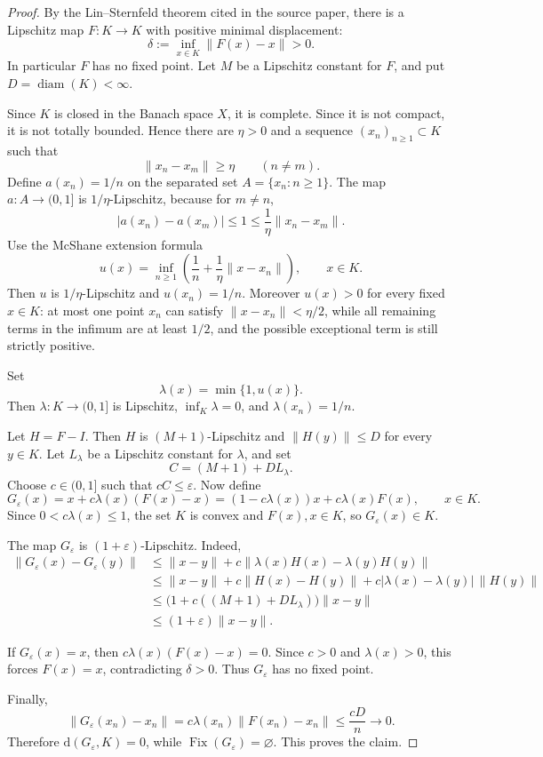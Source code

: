 \documentclass[11pt]{article}
\newcommand{\Fix}{\operatorname{Fix}}
\newcommand{\diam}{\operatorname{diam}}
\begin{document}
\begin{proof}
By the Lin--Sternfeld theorem cited in the source paper, there is a
Lipschitz map \(F:K\to K\) with positive minimal displacement:
\[
\delta:=\inf_{x\in K}\|F(x)-x\|>0.
\]
In particular \(F\) has no fixed point.  Let \(M\) be a Lipschitz constant
for \(F\), and put \(D=\diam(K)<\infty\).

Since \(K\) is closed in the Banach space \(X\), it is complete.  Since it
is not compact, it is not totally bounded.  Hence there are \(\eta>0\) and
a sequence \((x_n)_{n\ge 1}\subset K\) such that
\[
\|x_n-x_m\|\ge \eta \qquad (n\ne m).
\]
Define \(a(x_n)=1/n\) on the separated set \(A=\{x_n:n\ge 1\}\).  The map
\(a:A\to(0,1]\) is \(1/\eta\)-Lipschitz, because for \(m\ne n\),
\[
|a(x_n)-a(x_m)|\le 1\le \frac{1}{\eta}\|x_n-x_m\|.
\]
Use the McShane extension formula
\[
u(x)=\inf_{n\ge 1}\left(\frac{1}{n}+\frac{1}{\eta}\|x-x_n\|\right),
\qquad x\in K .
\]
Then \(u\) is \(1/\eta\)-Lipschitz and \(u(x_n)=1/n\).
Moreover \(u(x)>0\) for every fixed \(x\in K\): at most one point
\(x_n\) can satisfy \(\|x-x_n\|<\eta/2\), while all remaining terms in the
infimum are at least \(1/2\), and the possible exceptional term is still
strictly positive.

Set
\[
\lambda(x)=\min\{1,u(x)\}.
\]
Then \(\lambda:K\to(0,1]\) is Lipschitz, \(\inf_K\lambda=0\), and
\(\lambda(x_n)=1/n\).

Let \(H=F-I\).  Then \(H\) is \((M+1)\)-Lipschitz and
\(\|H(y)\|\le D\) for every \(y\in K\).  Let \(L_\lambda\) be a Lipschitz
constant for \(\lambda\), and set
\[
C=(M+1)+D L_\lambda .
\]
Choose \(c\in(0,1]\) such that \(cC\le \varepsilon\).  Now define
\[
G_\varepsilon(x)=x+c\lambda(x)(F(x)-x)
     =(1-c\lambda(x))x+c\lambda(x)F(x),\qquad x\in K .
\]
Since \(0<c\lambda(x)\le 1\), the set \(K\) is convex and
\(F(x),x\in K\), so \(G_\varepsilon(x)\in K\).

The map \(G_\varepsilon\) is \((1+\varepsilon)\)-Lipschitz.  Indeed,
\[
\begin{aligned}
\|G_\varepsilon(x)-G_\varepsilon(y)\|
&\le \|x-y\|+c\|\lambda(x)H(x)-\lambda(y)H(y)\|\\
&\le \|x-y\|+c\|H(x)-H(y)\|
     +c|\lambda(x)-\lambda(y)|\,\|H(y)\|\\
&\le \bigl(1+c((M+1)+D L_\lambda)\bigr)\|x-y\|\\
&\le (1+\varepsilon)\|x-y\|.
\end{aligned}
\]

If \(G_\varepsilon(x)=x\), then \(c\lambda(x)(F(x)-x)=0\).  Since
\(c>0\) and \(\lambda(x)>0\), this forces \(F(x)=x\), contradicting
\(\delta>0\).  Thus \(G_\varepsilon\) has no fixed point.

Finally,
\[
\|G_\varepsilon(x_n)-x_n\|=c\lambda(x_n)\|F(x_n)-x_n\|
\le \frac{cD}{n}\to 0 .
\]
Therefore \(\mathrm d(G_\varepsilon,K)=0\), while
\(\Fix(G_\varepsilon)=\varnothing\).  This proves the claim.
\end{proof}
\end{document}
